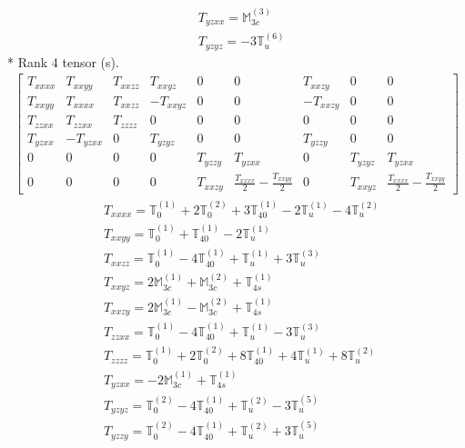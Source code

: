 \documentclass[fleqn,8pt,landscape]{jsarticle}
\begin{document}
\begin{align*}
& T_{yzxx} = \mathbb{M}_{3c}^{(3)} \\
& T_{yzyz} = - 3 \mathbb{T}_{u}^{(6)}
\end{align*}
* Rank 4 tensor (s).
\begin{align*}
\begin{bmatrix} T_{xxxx} & T_{xxyy} & T_{xxzz} & T_{xxyz} & 0 & 0 & T_{xxzy} & 0 & 0 \\ T_{xxyy} & T_{xxxx} & T_{xxzz} & - T_{xxyz} & 0 & 0 & - T_{xxzy} & 0 & 0 \\ T_{zzxx} & T_{zzxx} & T_{zzzz} & 0 & 0 & 0 & 0 & 0 & 0 \\ T_{yzxx} & - T_{yzxx} & 0 & T_{yzyz} & 0 & 0 & T_{yzzy} & 0 & 0 \\ 0 & 0 & 0 & 0 & T_{yzzy} & T_{yzxx} & 0 & T_{yzyz} & T_{yzxx} \\ 0 & 0 & 0 & 0 & T_{xxzy} & \frac{T_{xxxx}}{2} - \frac{T_{xxyy}}{2} & 0 & T_{xxyz} & \frac{T_{xxxx}}{2} - \frac{T_{xxyy}}{2} \end{bmatrix}
\end{align*}
\begin{align*}
& T_{xxxx} = \mathbb{T}_{0}^{(1)} + 2 \mathbb{T}_{0}^{(2)} + 3 \mathbb{T}_{40}^{(1)} - 2 \mathbb{T}_{u}^{(1)} - 4 \mathbb{T}_{u}^{(2)} \\
& T_{xxyy} = \mathbb{T}_{0}^{(1)} + \mathbb{T}_{40}^{(1)} - 2 \mathbb{T}_{u}^{(1)} \\
& T_{xxzz} = \mathbb{T}_{0}^{(1)} - 4 \mathbb{T}_{40}^{(1)} + \mathbb{T}_{u}^{(1)} + 3 \mathbb{T}_{u}^{(3)} \\
& T_{xxyz} = 2 \mathbb{M}_{3c}^{(1)} + \mathbb{M}_{3c}^{(2)} + \mathbb{T}_{4s}^{(1)} \\
& T_{xxzy} = 2 \mathbb{M}_{3c}^{(1)} - \mathbb{M}_{3c}^{(2)} + \mathbb{T}_{4s}^{(1)} \\
& T_{zzxx} = \mathbb{T}_{0}^{(1)} - 4 \mathbb{T}_{40}^{(1)} + \mathbb{T}_{u}^{(1)} - 3 \mathbb{T}_{u}^{(3)} \\
& T_{zzzz} = \mathbb{T}_{0}^{(1)} + 2 \mathbb{T}_{0}^{(2)} + 8 \mathbb{T}_{40}^{(1)} + 4 \mathbb{T}_{u}^{(1)} + 8 \mathbb{T}_{u}^{(2)} \\
& T_{yzxx} = - 2 \mathbb{M}_{3c}^{(1)} + \mathbb{T}_{4s}^{(1)} \\
& T_{yzyz} = \mathbb{T}_{0}^{(2)} - 4 \mathbb{T}_{40}^{(1)} + \mathbb{T}_{u}^{(2)} - 3 \mathbb{T}_{u}^{(5)} \\
& T_{yzzy} = \mathbb{T}_{0}^{(2)} - 4 \mathbb{T}_{40}^{(1)} + \mathbb{T}_{u}^{(2)} + 3 \mathbb{T}_{u}^{(5)}
\end{align*}
\end{document}
